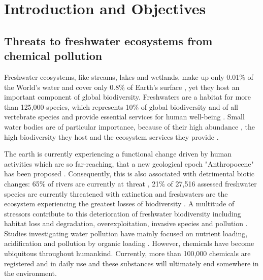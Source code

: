 

\chapter{Introduction and Objectives}
\label{sec:introduction} 

\section[Threats to freshwater ecosystems from chemical pollution]{\texorpdfstring{Threats to freshwater ecosystems from \\ chemical pollution}{Threats to freshwater ecosystems from chemical pollution}}

Freshwater ecosystems, like streams, lakes and wetlands, make up only 0.01\% of the World's water and cover only 0.8\% of Earth's surface \citep{dudgeon_freshwater_2006}, yet they host an important component of global biodiversity. 
Freshwaters are a habitat for more than 125,000 species, which represents 10\% of global biodiversity and  of all vertebrate species \citep{balian_freshwater_2007,  strayer_freshwater_2010} and provide essential services for human well-being \citep{aylward_freshwater_2005}. 
Small water bodies are of particular importance, because of their high abundance \citep{downing_global_2012}, the high biodiversity they host \citep{davies_comparative_2008} and the ecosystem services they provide \citep{biggs_importance_2016}. 

The earth is currently experiencing a functional change driven by human activities which are so far-reaching, that a new geological epoch "Anthropocene" has been proposed \citep{steffen_2011, waters_anthropocene_2016}. 
Consequently, this is also associated with detrimental biotic changes: 65\% of rivers are currently at threat \citep{vorosmarty_global_2010}, 21\% of 27,516 assessed freshwater species are currently threatened with extinction \citep{iucn_iucn_2016} and freshwaters are the ecosystem experiencing the greatest losses of biodiversity \citep{wwf_living_2016}. 
A multitude of stressors contribute to this deterioration of freshwater biodiversity including habitat loss and degradation, overexploitation, invasive species and pollution \citep{dudgeon_freshwater_2006, vorosmarty_global_2010, wwf_living_2016, collen_global_2014}. 
Studies investigating water pollution have mainly focused on nutrient loading, acidification and pollution by organic loading \citep{schafer_contribution_2016}. 
However, chemicals have become ubiquitous throughout humankind. 
Currently, more than 100,000 chemicals are registered and in daily use \citep{schwarzman_new_2009, schwarzenbach_global_2010} and these substances will ultimately end somewhere in the environment.

